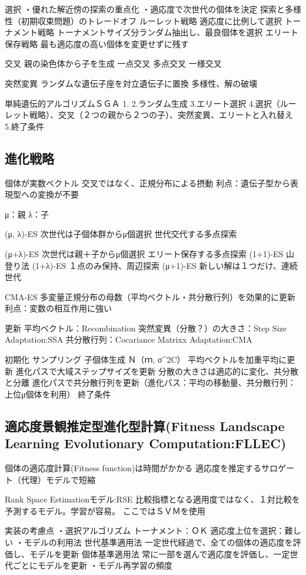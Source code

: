 \documentclass[twocolumn]{jarticle}     %
\begin{document}
選択
・優れた解近傍の探索の重点化
・適応度で次世代の個体を決定
探索と多様性（初期収束問題）のトレードオフ
ルーレット戦略
適応度に比例して選択
トーナメント戦略
トーナメントサイズ分ランダム抽出し、最良個体を選択
エリート保存戦略
最も適応度の高い個体を変更せずに残す

交叉
親の染色体から子を生成
一点交叉
多点交叉
一様交叉

突然変異
ランダムな遺伝子座を対立遺伝子に置換
多様性、解の破壊

単純遺伝的アルゴリズムＳＧＡ
1.
2.ランダム生成
3.エリート選択
4.選択（ルーレット戦略）、交叉（２つの親から２つの子）、突然変異、エリートと入れ替え
5.終了条件

\subsection{進化戦略}
個体が実数ベクトル
交叉ではなく、正規分布による摂動
利点：遺伝子型から表現型への変換が不要

μ：親
λ：子

(μ, λ)-ES
次世代は子個体群からμ個選択
世代交代する多点探索

(μ+λ)-ES
次世代は親＋子からμ個選択
エリート保存する多点探索
(1+1)-ES
山登り法
(1+λ)-ES
１点のみ保持、周辺探索
(μ+1)-ES
新しい解は１つだけ、連続世代


CMA-ES
多変量正規分布の母数（平均ベクトル・共分散行列）を効果的に更新
利点：変数の相互作用に強い

更新
平均ベクトル：Recombination
突然変異（分散？）の大きさ：Step Size  Adaptation:SSA
共分散行列：Cocariance Matrixx Adaptation:CMA

初期化
サンプリング
子個体生成
Ｎ（ｍ, σ^2C）
平均ベクトルを加重平均に更新
進化パスで大域ステップサイズを更新
分散の大きさは適応的に変化、共分散と分離
進化パスで共分散行列を更新（進化パス：平均の移動量、共分散行列：上位μ個体を利用）
終了条件

\subsection{適応度景観推定型進化型計算(Fitness Landscape Learning Evolutionary Computation:FLLEC)}

個体の適応度計算(Fitness function)は時間がかかる
適応度を推定するサロゲート（代理）モデルで短縮

Rank Space Estimationモデル:RSE
比較指標となる適用度ではなく、１対比較を予測するモデル。学習が容易。
ここではＳＶＭを使用

実装の考慮点
・選択アルゴリズム
トーナメント：ＯＫ
適応度上位を選択：難しい
・モデルの利用法
世代基準適用法
一定世代経過で、全ての個体の適応度を評価し、モデルを更新
個体基準適用法
常に一部を選んで適応度を評価し、一定世代ごとにモデルを更新
・モデル再学習の頻度
\end{document}
